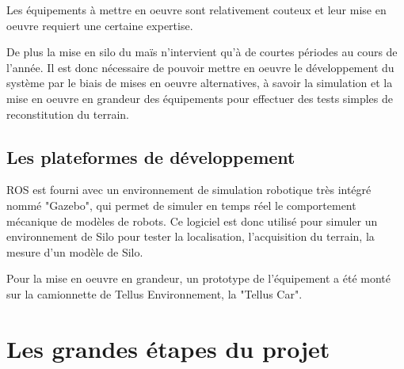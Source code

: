 \documentclass[12pt,a4paper]{report}
\begin{document}
		Les équipements à mettre en oeuvre sont relativement couteux et leur mise en oeuvre requiert une certaine expertise.
				
		De plus la mise en silo du maïs n'intervient qu'à de courtes périodes au cours de l'année. Il est donc nécessaire de pouvoir mettre en oeuvre le développement du système par le biais de mises en oeuvre alternatives, à savoir la simulation et la mise en oeuvre en grandeur des équipements pour effectuer des tests simples de reconstitution du terrain.
		
		\subsection{Les plateformes de développement}
		
		
		
		
				
		ROS est fourni avec un environnement de simulation robotique très intégré nommé "Gazebo", qui permet de simuler en temps réel le comportement mécanique de modèles de robots. Ce logiciel est donc utilisé pour simuler un environnement de Silo pour tester la localisation, l'acquisition du terrain, la mesure d'un modèle de Silo.
				
		Pour la mise en oeuvre en grandeur, un prototype de l'équipement a été monté sur la camionnette de Tellus Environnement, la "Tellus Car".
		
	\section{Les grandes étapes du projet}
	

	
				
\end{document}
